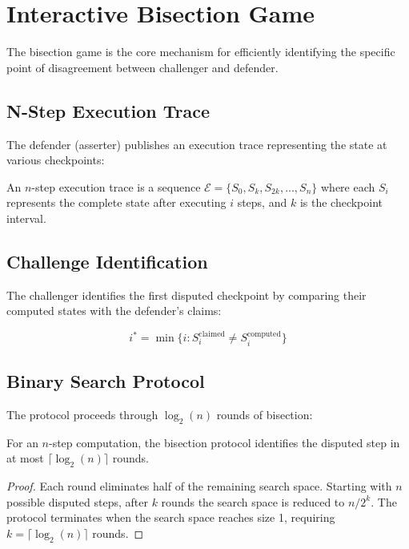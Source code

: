 \section{Interactive Bisection Game}


The bisection game is the core mechanism for efficiently identifying the specific point of disagreement between challenger and defender.

\subsection{N-Step Execution Trace}

The defender (asserter) publishes an execution trace representing the state at various checkpoints:

\begin{definition}
An $n$-step execution trace is a sequence $\mathcal{E} = \{S_0, S_{k}, S_{2k}, ..., S_n\}$ where each $S_i$ represents the complete state after executing $i$ steps, and $k$ is the checkpoint interval.
\end{definition}

\subsection{Challenge Identification}

The challenger identifies the first disputed checkpoint by comparing their computed states with the defender's claims:

\begin{equation}
i^* = \min\{i : S_i^{\text{claimed}} \neq S_i^{\text{computed}}\}
\end{equation}

\subsection{Binary Search Protocol}

The protocol proceeds through $\log_2(n)$ rounds of bisection:

\begin{theorem}
For an $n$-step computation, the bisection protocol identifies the disputed step in at most $\lceil\log_2(n)\rceil$ rounds.
\end{theorem}

\begin{proof}
Each round eliminates half of the remaining search space. Starting with $n$ possible disputed steps, after $k$ rounds the search space is reduced to $n/2^k$. The protocol terminates when the search space reaches size 1, requiring $k = \lceil\log_2(n)\rceil$ rounds.
\end{proof}


